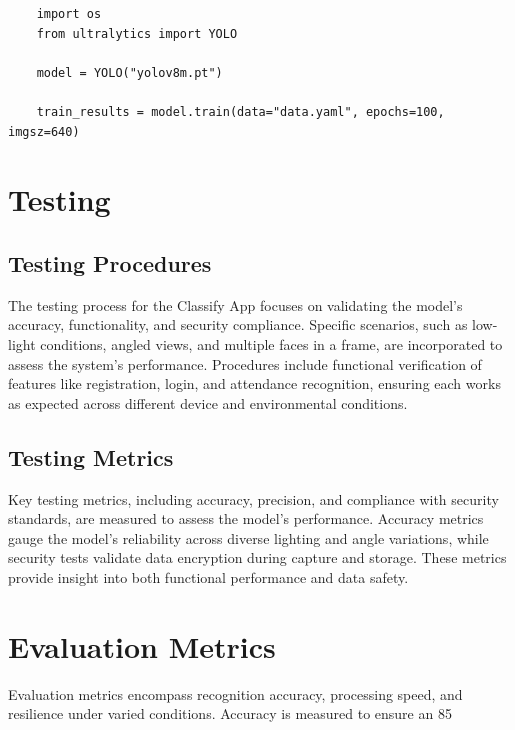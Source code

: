 \begin{verbatim}
    import os
    from ultralytics import YOLO

    model = YOLO("yolov8m.pt")
    
    train_results = model.train(data="data.yaml", epochs=100, imgsz=640)
\end{verbatim}

\section{Testing}
\subsection{Testing Procedures}
The testing process for the Classify App focuses on validating the model’s accuracy, functionality, and security compliance. Specific scenarios, such as low-light conditions, angled views, and multiple faces in a frame, are incorporated to assess the system’s performance. Procedures include functional verification of features like registration, login, and attendance recognition, ensuring each works as expected across different device and environmental conditions.

\subsection{Testing Metrics}
Key testing metrics, including accuracy, precision, and compliance with security standards, are measured to assess the model's performance. Accuracy metrics gauge the model’s reliability across diverse lighting and angle variations, while security tests validate data encryption during capture and storage. These metrics provide insight into both functional performance and data safety.

\section{Evaluation Metrics}
Evaluation metrics encompass recognition accuracy, processing speed, and resilience under varied conditions. Accuracy is measured to ensure an 85%

